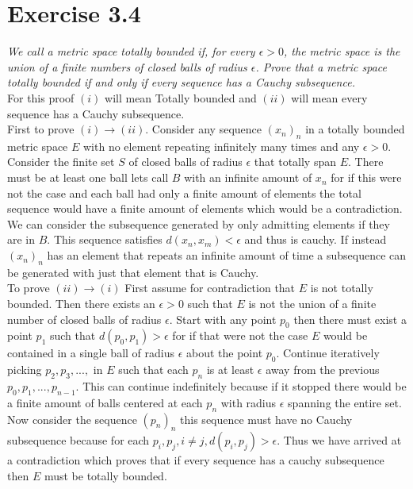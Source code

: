 \documentclass{amsart}
\begin{document}
    \section{Exercise 3.4}
        \emph{We call a metric space totally bounded if, for every $\epsilon > 0 $, the metric
    space is the union of a finite numbers of closed balls of radius $\epsilon $. Prove that a metric space
    totally bounded if and only if every sequence has a Cauchy subsequence.}\\
    For this proof $(i)$ will mean Totally bounded and $(ii)$ will mean every sequence has a Cauchy subsequence.\\
    First to prove $(i) \rightarrow (ii)$. Consider any sequence $(x_n)_n$ in a totally bounded metric space $E$ with no element repeating infinitely many times and any $\epsilon > 0$.
    Consider the finite set $S$ of closed balls of radius $\epsilon $ that totally span $E$. There must be at least one ball lets call $B$ with an infinite amount of $x_n$ for if this
    were not the case and each ball had only a finite amount of elements the total sequence would have a finite amount of elements which would be a contradiction. We can consider the subsequence generated by only admitting
    elements if they are in $B$. This sequence satisfies $d(x_n,x_m) < \epsilon $ and thus is cauchy. If instead $(x_n)_n$ has an element that repeats an infinite amount of time a subsequence can be generated with just that element that is Cauchy.
    \\
    To prove $(ii)\rightarrow (i)$  First assume for contradiction that $E$ is not totally bounded. Then there exists an $\epsilon > 0$ such that $E$ is not the union of a finite number of closed balls of radius $\epsilon $.
    Start with any point $p_0$ then there must exist a point $p_1$ such that $d(p_0,p_1) > \epsilon $ for if that were not the case $E$ would be contained in a single ball of radius $\epsilon $ about the point $p_0$.
    Continue iteratively picking $p_2,p_3,...,$ in $E$ such that each $p_n$ is at least $\epsilon $ away from the previous $p_0,p_1,...,p_{n-1}$. This can continue indefinitely because if it stopped there would be a finite amount of balls centered at each $p_n$ with radius $\epsilon $ spanning the entire set.
    Now consider the sequence $(p_n)_n$ this sequence must have no Cauchy subsequence because for each $p_i,p_j, i\ne j, d(p_i, p_j) > \epsilon $. Thus we have arrived at a contradiction which proves that if every sequence has a cauchy subsequence then $E$ must be totally bounded.
\end{document}
